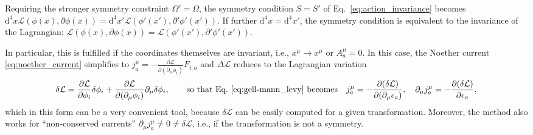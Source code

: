 \documentclass[prd,%
,superscriptaddress,%
nofootinbib,%
tightenlines ]{revtex4}
\newcommand{\dd}{\mathrm{d}}
\begin{document}
Requiring the stronger symmetry constraint $\Omega' = \Omega$, the symmetry condition $S=S'$ of Eq.~\eqref{eq:action_invariance} becomes 
$\dd^4 x \mathcal{L}(\phi(x), \partial \phi(x)) = \dd^4 x' \mathcal{L}(\phi'(x'), \partial' \phi'(x'))$. If further $\dd^4 x = \dd^4 x'$, the symmetry condition is equivalent to the invariance of the Lagrangian: $\mathcal{L}(\phi(x), \partial \phi(x)) = \mathcal{L}(\phi'(x'), \partial' \phi'(x'))$.

In particular, this is fulfilled if the coordinates themselves are invariant, i.e., $x^\mu \rightarrow x^\mu$ or $A_a^\mu = 0$.
In this case, the Noether current \eqref{eq:noether_current} simplifies to $j^\mu_a = -\frac{\partial \mathcal{L}}{\partial (\partial_\mu \phi_i)} F_{i,a}$ and $\Delta \mathcal{L}$ reduces to the Lagrangian variation
\begin{align}
	\delta \mathcal{L} = \frac{\partial \mathcal{L}}{\partial \phi_i} \delta \phi_i + \frac{\partial \mathcal{L}}{\partial(\partial_\mu \phi_i)} \partial_\mu \delta \phi_i,
	\qquad \text{so that Eq.~\eqref{eq:gell-mann_levy} becomes} \quad
	j^\mu_a = -\frac{\partial(\delta \mathcal{L})}{\partial(\partial_\mu \epsilon_a)},\quad
	\partial_\mu j^\mu_a = -\frac{\partial(\delta \mathcal{L})}{\partial \epsilon_a} ,
\end{align}
which in this form can be a very convenient tool, because $\delta \mathcal{L}$ can be easily computed for a given transformation. Moreover, the method also works for ``non-conserved currents'' $\partial_\mu j^\mu_a \neq 0 \neq \delta \mathcal{L}$, i.e., if the transformation is not a symmetry.
\end{document}

